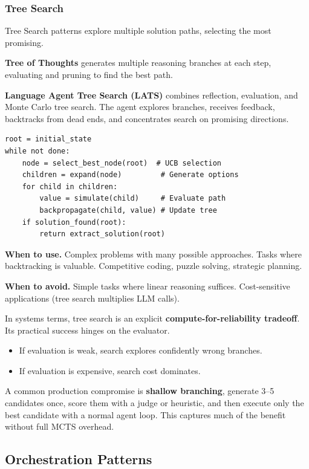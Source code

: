 \subsubsection{Tree Search}

Tree Search patterns explore multiple solution paths, selecting the most promising.

\textbf{Tree of Thoughts} generates multiple reasoning branches at each step, evaluating and pruning to find the best path.

\textbf{Language Agent Tree Search (LATS)} \cite{lats2023} combines reflection, evaluation, and Monte Carlo tree search. The agent explores branches, receives feedback, backtracks from dead ends, and concentrates search on promising directions.

\begin{verbatim}
root = initial_state
while not done:
    node = select_best_node(root)  # UCB selection
    children = expand(node)         # Generate options
    for child in children:
        value = simulate(child)     # Evaluate path
        backpropagate(child, value) # Update tree
    if solution_found(root):
        return extract_solution(root)
\end{verbatim}

\textbf{When to use.} Complex problems with many possible approaches. Tasks where backtracking is valuable. Competitive coding, puzzle solving, strategic planning.

\textbf{When to avoid.} Simple tasks where linear reasoning suffices. Cost-sensitive applications (tree search multiplies LLM calls).

In systems terms, tree search is an explicit \textbf{compute-for-reliability tradeoff}. Its practical success hinges on the evaluator.
\begin{itemize}
\item If evaluation is weak, search explores confidently wrong branches.
\item If evaluation is expensive, search cost dominates.
\end{itemize}
A common production compromise is \textbf{shallow branching}, generate 3--5 candidates once, score them with a judge or heuristic, and then execute only the best candidate with a normal agent loop. This captures much of the benefit without full MCTS overhead.

\subsection{Orchestration Patterns}

